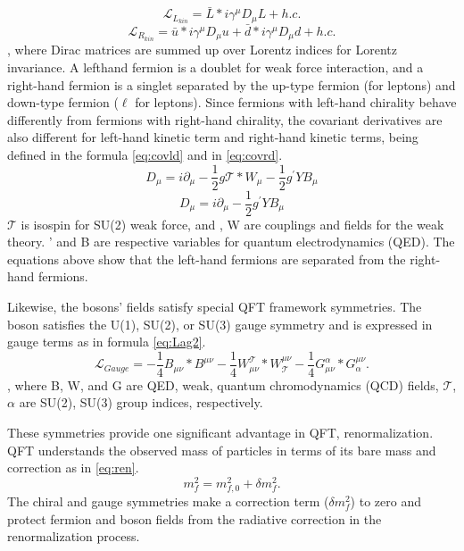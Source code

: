 \begin{equation}
\label{eq:Lag1}
	\mathcal{L}_{L_{kin}}  = \bar{L}*i\gamma^{\mu}D_{\mu}L+h.c.
\end{equation}
\begin{equation}
\label{eq:Lagr1}
	\mathcal{L}_{R_{kin}}  = \bar{u}*i\gamma^{\mu}D_{\mu}u+\bar{d}*i\gamma^{\mu}D_{\mu}d+h.c.
\end{equation}
, where Dirac matrices are summed up over Lorentz indices for Lorentz invariance. A lefthand fermion is a doublet for weak force interaction, and a right-hand fermion is a singlet separated by the up-type fermion (\PGnl for leptons) and down-type fermion ($\ell$ for leptons).
Since fermions with left-hand chirality behave differently from fermions with right-hand chirality,
the covariant derivatives are also different for left-hand kinetic term and right-hand kinetic terms, being defined in the formula \ref{eq:covld} and in \ref{eq:covrd}.
\begin{equation}
\label{eq:covld}
	D_{\mu}  = i\partial_{\mu}-\frac{1}{2}g\mathcal{T}*W_{\mu}-\frac{1}{2}g^{'}YB_{\mu} 
\end{equation}
\begin{equation}
\label{eq:covrd}
	D_{\mu}  = i\partial_{\mu}-\frac{1}{2}g^{'}YB_{\mu} 
\end{equation}
$\mathcal{T}$ is isospin for SU(2) weak force, and \Pg, W are couplings and fields for the weak theory. \Pg' and B are respective variables for quantum electrodynamics (QED).
The equations above show that the left-hand fermions are separated from the right-hand fermions.


Likewise, the bosons' fields satisfy special QFT framework symmetries.
The boson satisfies the U(1), SU(2), or SU(3) gauge symmetry and is expressed in gauge terms as in formula \ref{eq:Lag2}.
\begin{equation}
\label{eq:Lag2}
	\mathcal{L}_{Gauge} = -\frac{1}{4}B_{\mu\nu}*B^{\mu\nu}-\frac{1}{4}W_{\mu\nu}^{\mathcal{T}}*W^{\mu\nu}_{\mathcal{T}}-\frac{1}{4}G_{\mu\nu}^{\alpha}*G^{\mu\nu}_{\alpha}.
\end{equation}
, where B, W, and G are QED, weak, quantum chromodynamics (QCD) fields, $\mathcal{T}$, $\alpha$ are SU(2), SU(3) group indices, respectively.

These symmetries provide one significant advantage in QFT, renormalization.
QFT understands the observed mass of particles in terms of its bare mass and correction as in \ref{eq:ren}.
\begin{equation}
\label{eq:ren}
	m_{f}^{2}=m_{f,0}^{2}+\delta m_{f}^2.
\end{equation}
The chiral and gauge symmetries make a correction term ($\delta m_{f}^2$) to zero and protect fermion and boson fields from the radiative correction in the renormalization process.

